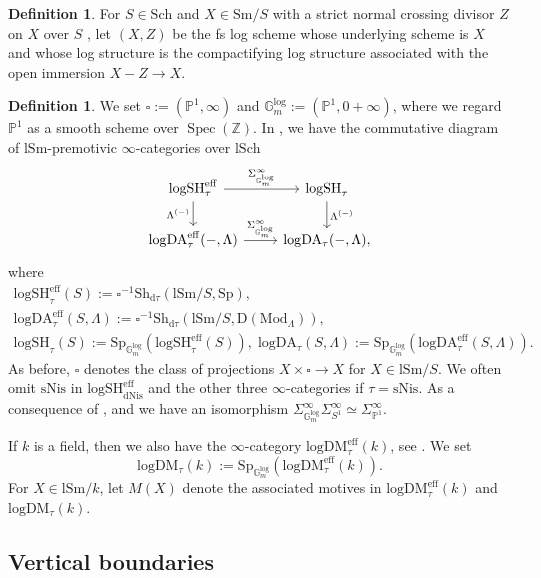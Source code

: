 \documentclass[10pt]{amsart}
\theoremstyle{definition}
\newtheorem{df}[thm]{Definition}
\theoremstyle{remark}
\numberwithin{equation}{subsection}
\renewcommand{\P}{\mathbb{P}}
\newcommand{\Z}{\mathbb{Z}}
\DeclareMathOperator{\Spec}{Spec}
\newcommand{\eff}{{\mathrm{eff}}}
\newcommand{\Spt}{\mathrm{Sp}}
\newcommand{\Sm}{\mathrm{Sm}}
\newcommand{\boxx}{\square}
\newcommand{\logSH}{\mathrm{logSH}}
\newcommand{\DLambda}{\mathrm{D}(\mathrm{Mod}_{\Lambda})}
\newcommand{\logDA}{\mathrm{log}\mathrm{DA}}
\newcommand{\Sch}{\mathrm{Sch}}
\newcommand{\lSch}{\mathrm{lSch}}
\newcommand{\lSm}{\mathrm{lSm}}
\newcommand{\infShv}{\mathrm{Sh}}
\newcommand{\Gmm}{\mathbb{G}_m^{\mathrm{log}}}
\newcommand{\logDM}{\mathrm{log}{\mathrm{DM}}}
\newcommand{\Stab}{\mathrm{Sp}}
\newcommand{\dtau}{\mathrm{d}\tau}
\newcommand{\sNis}{\mathrm{sNis}}
\newcommand{\dNis}{\mathrm{dNis}}
\begin{document}
\begin{df}
For $S\in \Sch$ and $X\in \Sm/S$ with a strict normal crossing divisor $Z$ on $X$ over $S$ \cite[Definition 7.2.1]{logDM}, let $(X,Z)$ be the fs log scheme whose underlying scheme is $X$ and whose log structure is the compactifying log structure \cite[Definition III.1.6.1]{Ogu} associated with the open immersion $X-Z\to X$.
\end{df}


\begin{df}
We set $\square:=(\P^1,\infty)$ and $\Gmm:=(\P^1,0+\infty)$,
where we regard $\P^1$ as a smooth scheme over $\Spec(\Z)$.
In \cite{logSH}, we have the commutative diagram of $\lSm$-premotivic $\infty$-categories over $\lSch$
\[
\begin{tikzcd}
\logSH_{\tau}^\eff\ar[r,"\Sigma_{\Gmm}^\infty"]\ar[d,"{\Lambda^{(-)}}"']&
\logSH_{\tau}\ar[d,"{\Lambda^{(-)}}"]
\\
\logDA_{\tau}^\eff(-,\Lambda)\ar[r,"\Sigma_{\Gmm}^\infty"]&
\logDA_{\tau}(-,\Lambda),
\end{tikzcd}
\]
where
\begin{gather*}
\logSH_{\tau}^\eff(S)
:=
\boxx^{-1}\infShv_{\dtau}(\lSm/S,\Spt),
\\
\logDA_{\tau}^\eff(S,\Lambda)
:=
\boxx^{-1}\infShv_{\dtau}(\lSm/S,\DLambda),
\\
\logSH_{\tau}(S)
:=
\Stab_{\Gmm}(\logSH_{\tau}^\eff(S)),
\;
\logDA_{\tau}(S,\Lambda)
:=
\Stab_{\Gmm}(\logDA_{\tau}^\eff(S,\Lambda)).
\end{gather*}
As before, $\boxx$ denotes the class of projections $X\times \boxx\to X$ for $X\in \lSm/S$.
We often omit $\sNis$ in $\logSH_{\dNis}^\eff$ and the other three $\infty$-categories if $\tau=\sNis$.
As a consequence of \cite[Proposition 2.5.11]{logSH}, and we have an isomorphism $\Sigma_{\Gmm}^\infty \Sigma_{S^1}^\infty \simeq \Sigma_{\P^1}^\infty$.

If $k$ is a field, then we also have the $\infty$-category $\logDM^\eff_{\tau}(k)$, see \cite[Definition 5.2.1]{logDM}.
We set
\[
\logDM_{\tau}(k):=\Stab_{\Gmm}(\logDM_{\tau}^\eff(k)).
\]
For $X\in \lSm/k$, let $M(X)$ denote the associated motives in $\logDM_{\tau}^\eff(k)$ and $\logDM_{\tau}(k)$.
\end{df}

\subsection{Vertical boundaries}
\label{vertical_boundaries}
\end{document}
